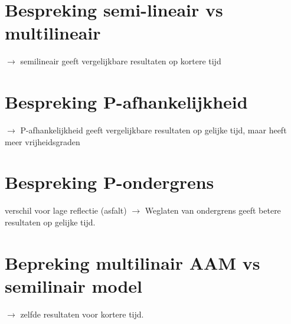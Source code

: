 \documentclass[12pt]{report}
\begin{document}
\section{Bespreking semi-lineair vs multilineair}

$\rightarrow$ semilineair geeft vergelijkbare resultaten op kortere tijd

\section{Bespreking P-afhankelijkheid}

$\rightarrow$ P-afhankelijkheid geeft vergelijkbare resultaten op gelijke tijd, maar heeft meer vrijheidsgraden

\section{Bespreking P-ondergrens}

verschil voor lage reflectie (asfalt)
$\rightarrow$ Weglaten van ondergrens geeft betere resultaten op gelijke tijd.

\section{Bepreking multilinair AAM vs semilinair model}

$\rightarrow$ zelfde resultaten voor kortere tijd.

\begin{appendices}


\end{appendices}


\begin{flushleft}
\nocite{*}
{}


\end{flushleft}
\end{document}
